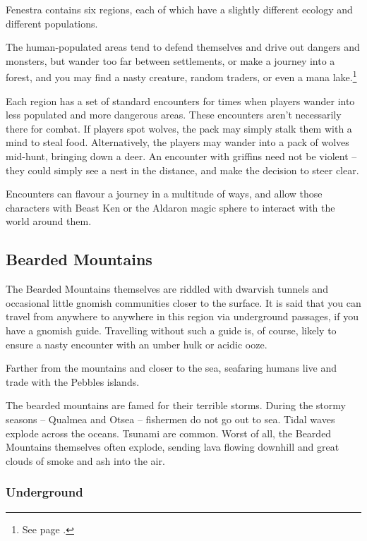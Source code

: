 \begin{multicols}{2}

Fenestra contains six regions, each of which have a slightly different ecology and different populations.

The human-populated areas tend to defend themselves and drive out dangers and monsters, but wander too far between settlements, or make a journey into a forest, and you may find a nasty creature, random traders, or even a mana lake.\footnote{See page \pageref{mana_lake}.}

Each region has a set of standard encounters for times when players wander into less populated and more dangerous areas.  These encounters aren't necessarily there for combat.  If players spot wolves, the pack may simply stalk them with a mind to steal food.  Alternatively, the players may wander into a pack of wolves mid-hunt, bringing down a deer.  An encounter with griffins need not be violent -- they could simply see a nest in the distance, and make the decision to steer clear.

Encounters can flavour a journey in a multitude of ways, and allow those characters with Beast Ken or the Aldaron magic sphere to interact with the world around them.

\subsection{Bearded Mountains}

The Bearded Mountains themselves are riddled with dwarvish tunnels and occasional little gnomish communities closer to the surface.  It is said that you can travel from anywhere to anywhere in this region via underground passages, if you have a gnomish guide.  Travelling without such a guide is, of course, likely to ensure a nasty encounter with an umber hulk or acidic ooze.

Farther from the mountains and closer to the sea, seafaring humans live and trade with the Pebbles islands.

The bearded mountains are famed for their terrible storms.  During the stormy seasons -- Qualmea and Otsea -- fishermen do not go out to sea.  Tidal waves explode across the oceans.  Tsunami are common.  Worst of all, the Bearded Mountains themselves often explode, sending lava flowing downhill and great clouds of smoke and ash into the air.

\subsubsection{Underground}


\end{multicols}
